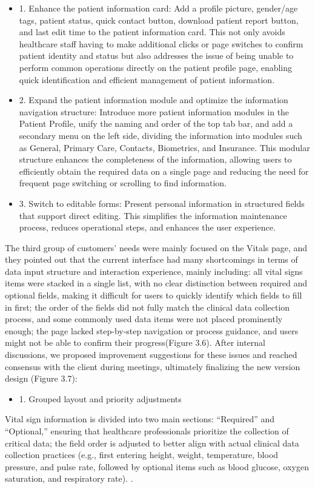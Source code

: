 \begin{itemize}
    \item 1. Enhance the patient information card: Add a profile picture, gender/age tags, patient status, quick contact button, download patient report button, and last edit time to the patient information card. This not only avoids healthcare staff having to make additional clicks or page switches to confirm patient identity and status but also addresses the issue of being unable to perform common operations directly on the patient profile page, enabling quick identification and efficient management of patient information.
    \item 2. Expand the patient information module and optimize the information navigation structure: Introduce more patient information modules in the Patient Profile, unify the naming and order of the top tab bar, and add a secondary menu on the left side, dividing the information into modules such as General, Primary Care, Contacts, Biometrics, and Insurance. This modular structure enhances the completeness of the information, allowing users to efficiently obtain the required data on a single page and reducing the need for frequent page switching or scrolling to find information.
    \item 3. Switch to editable forms: Present personal information in structured fields that support direct editing. This simplifies the information maintenance process, reduces operational steps, and enhances the user experience.
\end{itemize}
The third group of customers' needs were mainly focused on the Vitals page, and they pointed out that the current interface had many shortcomings in terms of data input structure and interaction experience, mainly including: all vital signs items were stacked in a single list, with no clear distinction between required and optional fields, making it difficult for users to quickly identify which fields to fill in first; the order of the fields did not fully match the clinical data collection process, and some commonly used data items were not placed prominently enough; the page lacked step-by-step navigation or process guidance, and users might not be able to confirm their progress(Figure 3.6). After internal discussions, we proposed improvement suggestions for these issues and reached consensus with the client during meetings, ultimately finalizing the new version design (Figure 3.7):

\begin{itemize}
    \item 1. Grouped layout and priority adjustments
\end{itemize}
Vital sign information is divided into two main sections: “Required” and “Optional,” ensuring that healthcare professionals prioritize the collection of critical data; the field order is adjusted to better align with actual clinical data collection practices (e.g., first entering height, weight, temperature, blood pressure, and pulse rate, followed by optional items such as blood glucose, oxygen saturation, and respiratory rate). \cite{webform}.

